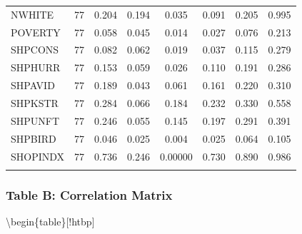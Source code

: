 \documentclass[
]{article}
\begin{document}
\begin{table}[!htbp]
\begin{tabular}{@{\extracolsep{5pt}}lccccccc}
NWHITE & 77 & 0.204 & 0.194 & 0.035 & 0.091 & 0.205 & 0.995 \\ 
POVERTY & 77 & 0.058 & 0.045 & 0.014 & 0.027 & 0.076 & 0.213 \\ 
SHPCONS & 77 & 0.082 & 0.062 & 0.019 & 0.037 & 0.115 & 0.279 \\ 
SHPHURR & 77 & 0.153 & 0.059 & 0.026 & 0.110 & 0.191 & 0.286 \\ 
SHPAVID & 77 & 0.189 & 0.043 & 0.061 & 0.161 & 0.220 & 0.310 \\ 
SHPKSTR & 77 & 0.284 & 0.066 & 0.184 & 0.232 & 0.330 & 0.558 \\ 
SHPUNFT & 77 & 0.246 & 0.055 & 0.145 & 0.197 & 0.291 & 0.391 \\ 
SHPBIRD & 77 & 0.046 & 0.025 & 0.004 & 0.025 & 0.064 & 0.105 \\ 
SHOPINDX & 77 & 0.736 & 0.246 & 0.00000 & 0.730 & 0.890 & 0.986 \\ 
\hline \\[-1.8ex] 
\end{tabular} 
\end{table}

\hypertarget{table-b-correlation-matrix}{%
\subsubsection{Table B: Correlation
Matrix}\label{table-b-correlation-matrix}}

\textbackslash begin\{table\}{[}!htbp{]} \centering 

\caption{} 
  \label{}
\end{document}
